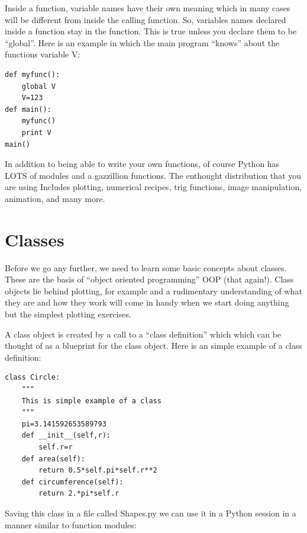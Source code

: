 \documentclass[11pt]{book}
\begin{document}
{{{Inside a function,  variable names have their own meaning  which in many cases will be different from inside the calling function.  So,  variables names declared inside a function stay in the function.  This is true unless you declare them to be ``global''.
Here is an example in which the main program  ``knows'' about the functions variable {\color{blue}V}:  

{ \color{blue} \begin{verbatim}
def myfunc():
    global V
    V=123
def main():
    myfunc()
    print V
main()
\end{verbatim}}







In addition to being able to write your own functions, of course 
Python has LOTS of modules and a gazzillion functions. The enthought distribution that you are using
Includes plotting, numerical recipes, trig functions, image manipulation, animation,  and many more. 



\section{Classes}

Before we go any further, we need to learn some basic concepts about classes. These 
 are the basis of  ``object oriented programming'' OOP (that again!).   Class objects lie behind plotting, for example and a rudimentary understanding of what they are and how they work will come in handy when we start doing anything but the simplest plotting exercises.  
 
  A class object is   created by a call  to a ``class definition''  which which can be thought of as a blueprint for the class object.  Here is an simple example of a class definition:

{ \color{blue} \begin{verbatim}
class Circle:
    """
    This is simple example of a class
    """
    pi=3.141592653589793
    def __init__(self,r):
        self.r=r
    def area(self):
        return 0.5*self.pi*self.r**2
    def circumference(self):
        return 2.*pi*self.r

\end{verbatim}}

\noindent Saving this class in a file called {\color{blue}Shapes.py} we can use it in a Python session in a manner similar to function modules:

}}}
\end{document}
